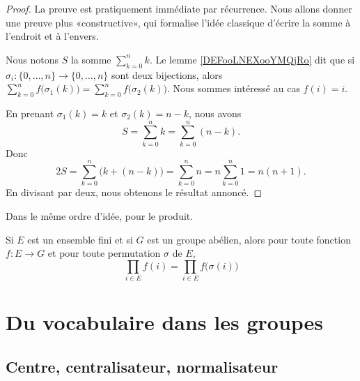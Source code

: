 \begin{proof}
    La preuve est pratiquement immédiate par récurrence. Nous allons donner une preuve plus «constructive», qui formalise l'idée classique d'écrire la somme à l'endroit et à l'envers.


    Nous notons \( S\) la somme \( \sum_{k=0}^nk\). Le lemme \ref{DEFooLNEXooYMQjRo} dit que si \( \sigma_i\colon \{ 0,\ldots, n \}\to \{ 0,\ldots, n \}\) sont deux bijections, alors \( \sum_{k=0}^nf\big( \sigma_1(k) \big)=\sum_{k=0}^nf\big( \sigma_2(k) \big)\). Nous sommes intéressé au cas \( f(i)=i\).

    En prenant \( \sigma_1(k)=k\) et \( \sigma_2(k)=n-k\), nous avons
    \begin{equation}
        S=\sum_{k=0}^nk=\sum_{k=0}^n(n-k).
    \end{equation}
    Donc
    \begin{equation}
        2S=\sum_{k=0}^n\big( k+(n-k) \big)=\sum_{k=0}^nn=n\sum_{k=0}^n1=n(n+1).
    \end{equation}
    En divisant par deux, nous obtenons le résultat annoncé.
\end{proof}

Dans le même ordre d'idée, pour le produit.
\begin{proposition}     \label{PROPooQMUDooQQVRIe}
    Si \( E\) est un ensemble fini et si \( G\) est un groupe abélien, alors pour toute fonction \( f\colon E\to G\) et pour toute permutation \( \sigma\) de \( E\),
    \begin{equation}
        \prod_{i\in E}f(i)=\prod_{i\in E}f\big( \sigma(i) \big)
    \end{equation}
\end{proposition}

\section{Du vocabulaire dans les groupes}

\subsection{Centre, centralisateur, normalisateur}

